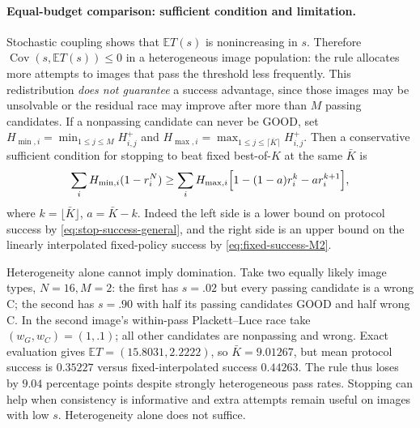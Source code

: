 \paragraph{Equal-budget comparison: sufficient condition and limitation.}
Stochastic coupling shows that $\mathbb ET(s)$ is nonincreasing in
$s$. Therefore $\operatorname{Cov}(s,\mathbb ET(s))\le0$ in a
heterogeneous image population: the rule allocates more attempts to
images that pass the threshold less frequently. This redistribution
\emph{does not guarantee} a success advantage, since those images may
be unsolvable or the residual race may improve after more than $M$
passing candidates. If a nonpassing candidate can never be GOOD,
set $H_{\min,i}=\min_{1\le j\le M}H_{i,j}^+$ and
$H_{\max,i}=\max_{1\le j\le\lceil\bar K\rceil}H_{i,j}^+$.
Then a conservative sufficient condition for stopping to beat fixed
best-of-$K$ at the same $\bar K$ is
\begin{equation}\label{eq:stop-sufficient}
 \sum_i H_{\min,i}(1-r_i^N)\ge
 \sum_i H_{\max,i}\Bigl[1-(1-a)r_i^k-a r_i^{k+1}\Bigr],
\end{equation}
where $k=\lfloor\bar K\rfloor$, $a=\bar K-k$.
Indeed the left side is a lower bound on protocol success by
\eqref{eq:stop-success-general}, and the right side is an upper bound
on the linearly interpolated fixed-policy success by
\eqref{eq:fixed-success-M2}.

Heterogeneity alone cannot imply domination. Take two equally likely
image types, $N=16,M=2$: the first has $s=.02$ but every passing
candidate is a wrong C; the second has $s=.90$ with half its passing
candidates GOOD and half wrong C. In the second image's within-pass
Plackett--Luce race take $(w_G,w_C)=(1,.1)$; all other candidates are
nonpassing and wrong. Exact evaluation gives
$\mathbb ET=(15.8031,2.2222)$, so $\bar K=9.01267$, but mean protocol
success is $0.35227$ versus fixed-interpolated success $0.44263$.
The rule thus loses by $9.04$ percentage points despite
strongly heterogeneous pass rates. Stopping can help when
consistency is informative and extra attempts remain useful
on images with low $s$. Heterogeneity alone does not suffice.

